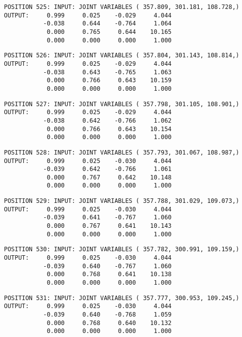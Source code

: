 \begin{verbatim}
POSITION 525: INPUT: JOINT VARIABLES ( 357.809, 301.181, 108.728,)
OUTPUT:     0.999     0.025    -0.029     4.044
           -0.038     0.644    -0.764     1.064
            0.000     0.765     0.644    10.165
            0.000     0.000     0.000     1.000
\end{verbatim} \pagebreak[1]\begin{verbatim}
POSITION 526: INPUT: JOINT VARIABLES ( 357.804, 301.143, 108.814,)
OUTPUT:     0.999     0.025    -0.029     4.044
           -0.038     0.643    -0.765     1.063
            0.000     0.766     0.643    10.159
            0.000     0.000     0.000     1.000
\end{verbatim} \pagebreak[1]\begin{verbatim}
POSITION 527: INPUT: JOINT VARIABLES ( 357.798, 301.105, 108.901,)
OUTPUT:     0.999     0.025    -0.029     4.044
           -0.038     0.642    -0.766     1.062
            0.000     0.766     0.643    10.154
            0.000     0.000     0.000     1.000
\end{verbatim} \pagebreak[1]\begin{verbatim}
POSITION 528: INPUT: JOINT VARIABLES ( 357.793, 301.067, 108.987,)
OUTPUT:     0.999     0.025    -0.030     4.044
           -0.039     0.642    -0.766     1.061
            0.000     0.767     0.642    10.148
            0.000     0.000     0.000     1.000
\end{verbatim} \pagebreak[1]\begin{verbatim}
POSITION 529: INPUT: JOINT VARIABLES ( 357.788, 301.029, 109.073,)
OUTPUT:     0.999     0.025    -0.030     4.044
           -0.039     0.641    -0.767     1.060
            0.000     0.767     0.641    10.143
            0.000     0.000     0.000     1.000
\end{verbatim} \pagebreak[1]\begin{verbatim}
POSITION 530: INPUT: JOINT VARIABLES ( 357.782, 300.991, 109.159,)
OUTPUT:     0.999     0.025    -0.030     4.044
           -0.039     0.640    -0.767     1.060
            0.000     0.768     0.641    10.138
            0.000     0.000     0.000     1.000
\end{verbatim} \pagebreak[1]\begin{verbatim}
POSITION 531: INPUT: JOINT VARIABLES ( 357.777, 300.953, 109.245,)
OUTPUT:     0.999     0.025    -0.030     4.044
           -0.039     0.640    -0.768     1.059
            0.000     0.768     0.640    10.132
            0.000     0.000     0.000     1.000
\end{verbatim} \pagebreak[1]\begin{verbatim}

\end{verbatim}
